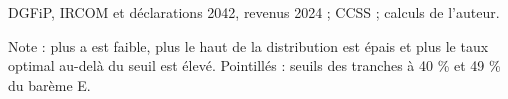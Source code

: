 DGFiP, IRCOM et déclarations 2042, revenus 2024 ; CCSS ; calculs de l'auteur.\par Note : plus a est faible, plus le haut de la distribution est épais et plus le taux optimal au-delà du seuil est élevé. Pointillés : seuils des tranches à 40 \% et 49 \% du barème E.
